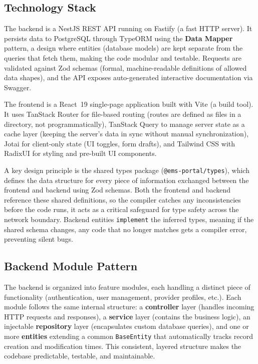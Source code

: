 \subsection{Technology Stack}
The backend is a NestJS REST API running on Fastify (a fast HTTP server). It
persists data to PostgreSQL through TypeORM using the \textbf{Data Mapper}
pattern, a design where entities (database models) are kept separate from the
queries that fetch them, making the code modular and testable. Requests are
validated against Zod schemas (formal, machine-readable definitions of allowed
data shapes), and the API exposes auto-generated interactive documentation via
Swagger.

The frontend is a React~19 single-page application built with Vite (a build
tool). It uses TanStack Router for file-based routing (routes are defined as
files in a directory, not programmatically), TanStack Query to manage server
state as a cache layer (keeping the server's data in sync without manual
synchronization), Jotai for client-only state (UI toggles, form
drafts), and Tailwind CSS with RadixUI for styling and pre-built UI
components.

A key design principle is the shared types package (\texttt{@ems-portal/types}),
which defines the data structure for every piece of information exchanged between
the frontend and backend using Zod schemas. Both the frontend and backend
reference these shared definitions, so the compiler catches any inconsistencies
before the code runs, it acts as a critical safeguard for type safety across the network
boundary. Backend entities \texttt{implement} the inferred types, meaning if the
shared schema changes, any code that no longer matches gets a compiler error,
preventing silent bugs.

\subsection{Backend Module Pattern}
The backend is organized into feature modules, each handling a distinct piece of
functionality (authentication, user management, provider profiles, etc.). Each
module follows the same internal structure: a \textbf{controller} layer (handles
incoming HTTP requests and responses), a \textbf{service} layer (contains the
business logic), an injectable \textbf{repository} layer (encapsulates custom
database queries), and one or more \textbf{entities} extending a common
\texttt{BaseEntity} that automatically tracks record creation and modification
times. This consistent, layered structure makes the codebase predictable,
testable, and maintainable.

